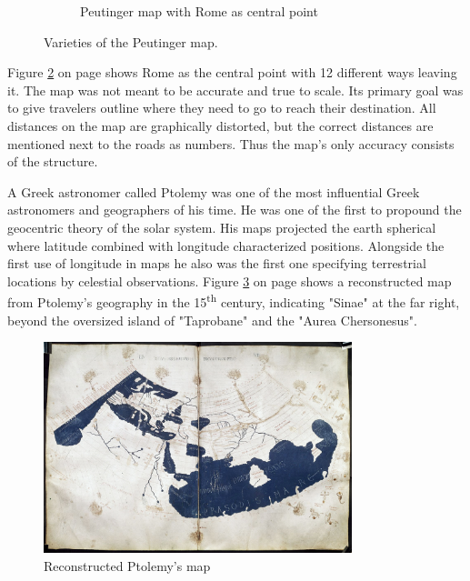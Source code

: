 \begin{figure}[!htb]
\begin{subfigure}[b]{0.4\textwidth}
    \caption{Peutinger map with Rome as central point}
    \label{fig:peutinger-rome}
  \end{subfigure}
  \caption[
    Varieties of the Peutinger map, Urldate: 07.2106
    \newline
    \small\texttt{\url{https://web.archive.org/web/20080129123649/http://www.kargi.de/Geschichte/Peutinger/Peutinger.bmp}}
    \newline
    \small\texttt{\url{https://web.archive.org/web/20060106224928/http://www.kargi.de/Geschichte/Peutinger/peutinger_rom.jpg}}
  ]{
    Varieties of the Peutinger map.
  }
\end{figure}
\cbend

Figure \ref{fig:peutinger-rome} on page \pageref{fig:peutinger-rome} shows Rome as the central point with 12 different ways leaving it. The map was not meant to be accurate and true to scale. Its primary goal was to give travelers outline where they need to go to reach their destination. All distances on the map are graphically distorted, but the correct distances are mentioned next to the roads as numbers. Thus the map's only accuracy consists of the structure.

A Greek astronomer called Ptolemy was one of the most influential Greek astronomers and geographers of his time. He was one of the first to propound the geocentric theory of the solar system. His maps projected the earth spherical where latitude combined with longitude characterized positions. Alongside the first use of longitude in maps he also was the first one specifying terrestrial locations by celestial observations. Figure \ref{fig:ptolemy} on page \pageref{fig:ptolemy} shows a reconstructed map from Ptolemy's geography in the 15\textsuperscript{th} century, indicating "Sinae" at the far right, beyond the oversized island of "Taprobane" and the "Aurea Chersonesus".

\begin{figure}[!htb]
\centering
\includegraphics[width=0.8\textwidth,keepaspectratio]{images/history/ptolemy-map.jpg}
\caption[
    Reconstructed Ptolemy's map, Urldate: 07.2016 \newline
\small\texttt{\url{https://upload.wikimedia.org/wikipedia/commons/2/23/PtolemyWorldMap.jpg}}
]{Reconstructed Ptolemy's map}
\label{fig:ptolemy}
\end{figure}

